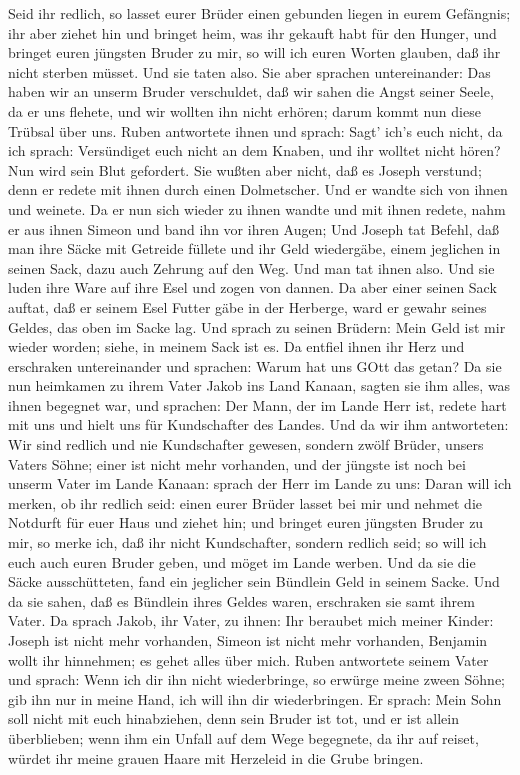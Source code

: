  Seid ihr redlich, so lasset eurer Brüder einen gebunden
liegen in eurem Gefängnis; ihr aber ziehet hin und bringet heim, was ihr
gekauft habt für den Hunger,  und bringet euren jüngsten
Bruder zu mir, so will ich euren Worten glauben, daß ihr nicht sterben
müsset. Und sie taten also.  Sie aber sprachen
untereinander: Das haben wir an unserm Bruder verschuldet, daß wir sahen
die Angst seiner Seele, da er uns flehete, und wir wollten ihn nicht
erhören; darum kommt nun diese Trübsal über uns.  Ruben
antwortete ihnen und sprach: Sagt' ich's euch nicht, da ich sprach:
Versündiget euch nicht an dem Knaben, und ihr wolltet nicht hören? Nun
wird sein Blut gefordert.  Sie wußten aber nicht, daß es
Joseph verstund; denn er redete mit ihnen durch einen Dolmetscher.
 Und er wandte sich von ihnen und weinete. Da er nun sich
wieder zu ihnen wandte und mit ihnen redete, nahm er aus ihnen Simeon
und band ihn vor ihren Augen;  Und Joseph tat Befehl, daß
man ihre Säcke mit Getreide füllete und ihr Geld wiedergäbe, einem
jeglichen in seinen Sack, dazu auch Zehrung auf den Weg. Und man tat
ihnen also.  Und sie luden ihre Ware auf ihre Esel und
zogen von dannen.  Da aber einer seinen Sack auftat, daß er
seinem Esel Futter gäbe in der Herberge, ward er gewahr seines Geldes,
das oben im Sacke lag.  Und sprach zu seinen Brüdern: Mein
Geld ist mir wieder worden; siehe, in meinem Sack ist es. Da entfiel
ihnen ihr Herz und erschraken untereinander und sprachen: Warum hat uns
GOtt das getan?  Da sie nun heimkamen zu ihrem Vater Jakob
ins Land Kanaan, sagten sie ihm alles, was ihnen begegnet war, und
sprachen:  Der Mann, der im Lande Herr ist, redete hart mit
uns und hielt uns für Kundschafter des Landes.  Und da wir
ihm antworteten: Wir sind redlich und nie Kundschafter gewesen,
 sondern zwölf Brüder, unsers Vaters Söhne; einer ist nicht
mehr vorhanden, und der jüngste ist noch bei unserm Vater im Lande
Kanaan:  sprach der Herr im Lande zu uns: Daran will ich
merken, ob ihr redlich seid: einen eurer Brüder lasset bei mir und
nehmet die Notdurft für euer Haus und ziehet hin;  und
bringet euren jüngsten Bruder zu mir, so merke ich, daß ihr nicht
Kundschafter, sondern redlich seid; so will ich euch auch euren Bruder
geben, und möget im Lande werben.  Und da sie die Säcke
ausschütteten, fand ein jeglicher sein Bündlein Geld in seinem Sacke.
Und da sie sahen, daß es Bündlein ihres Geldes waren, erschraken sie
samt ihrem Vater.  Da sprach Jakob, ihr Vater, zu ihnen:
Ihr beraubet mich meiner Kinder: Joseph ist nicht mehr vorhanden, Simeon
ist nicht mehr vorhanden, Benjamin wollt ihr hinnehmen; es gehet alles
über mich.  Ruben antwortete seinem Vater und sprach: Wenn
ich dir ihn nicht wiederbringe, so erwürge meine zween Söhne; gib ihn
nur in meine Hand, ich will ihn dir wiederbringen.  Er
sprach: Mein Sohn soll nicht mit euch hinabziehen, denn sein Bruder ist
tot, und er ist allein überblieben; wenn ihm ein Unfall auf dem Wege
begegnete, da ihr auf reiset, würdet ihr meine grauen Haare mit
Herzeleid in die Grube bringen.

